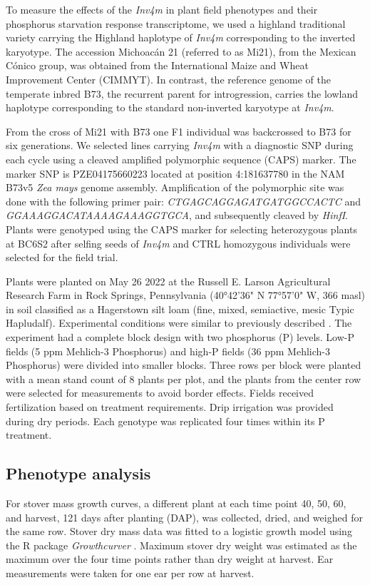 \documentclass[9pt,twocolumn,twoside]{rilabRxiv}
\newcommand{\invfour}{\textit{Inv4m}\xspace}
\begin{document}
To measure the effects of the \invfour in plant field phenotypes and their phosphorus starvation response transcriptome, we used a highland traditional variety carrying the Highland haplotype of \invfour corresponding to the inverted karyotype.
The accession Michoacán 21 (referred to as Mi21), from the Mexican Cónico group, was obtained from the International Maize and Wheat Improvement Center (CIMMYT).
In contrast, the reference genome of the temperate inbred B73, the recurrent parent for introgression, carries the lowland haplotype corresponding to the standard non-inverted karyotype at \invfour.

From the cross of Mi21 with B73 one F1 individual was backcrossed to B73 for six generations.
We selected lines carrying \invfour with a diagnostic SNP during each cycle using a cleaved amplified polymorphic sequence (CAPS) marker.
The marker SNP is PZE04175660223 located at position 4:181637780 in the NAM B73v5 \textit{Zea mays} genome assembly.
Amplification of the polymorphic site was done with the following primer pair: \textit{CTGAGCAGGAGATGATGGCCACTC} and \textit{GGAAAGGACATAAAAGAAAGGTGCA}, and subsequently cleaved by \textit{HinfI}.
Plants were genotyped using the CAPS marker for selecting heterozygous plants at BC6S2 after selfing seeds of \invfour and CTRL homozygous individuals were selected for the field trial.

Plants were planted on May 26 2022 at the Russell E.
Larson Agricultural Research Farm in Rock Springs, Pennsylvania (40°42'36" N 77°57'0" W, 366 masl) in soil classified as a Hagerstown silt loam (fine, mixed, semiactive, mesic Typic Hapludalf).
Experimental conditions were similar to previously described \cite{strock2018}.
The experiment had a complete block design with two phosphorus (P) levels.
Low-P fields (5 ppm Mehlich-3 Phosphorus) and high-P fields (36 ppm Mehlich-3 Phosphorus) were divided into smaller blocks.
Three rows per block were planted with a mean stand count of 8 plants per plot, and the plants from the center row were selected for measurements to avoid border effects.
Fields received fertilization based on treatment requirements.
Drip irrigation was provided during dry periods.
Each genotype was replicated four times within its P treatment.

\subsection{Phenotype analysis}

For stover mass growth curves, a different plant at each time point 40, 50, 60, and harvest, 121 days after planting (DAP), was collected, dried, and weighed for the same row.
Stover dry mass data was fitted to a logistic growth model using the R package \textit{Growthcurver} \cite{sprouffske2016}.
Maximum stover dry weight was estimated as the maximum over the four time points rather than dry weight at harvest.
Ear measurements were taken for one ear per row at harvest.
\end{document}
